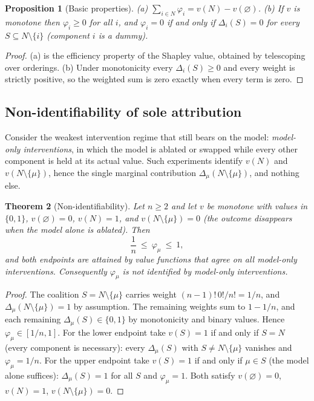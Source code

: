 \documentclass[11pt]{article}
\newtheorem{theorem}{Theorem}[section]
\newtheorem{proposition}[theorem]{Proposition}
\theoremstyle{definition}
\begin{document}
\begin{proposition}[Basic properties]\label{prop:B1}
(a) $\sum_{i\in N}\varphi_i=v(N)-v(\varnothing)$. (b) If $v$ is monotone then $\varphi_i\ge0$ for all $i$, and $\varphi_i=0$ if and only if $\Delta_i(S)=0$ for every $S\subseteq N\setminus\{i\}$ (component $i$ is a \emph{dummy}).
\end{proposition}
\begin{proof}
(a) is the efficiency property of the Shapley value, obtained by telescoping over orderings. (b) Under monotonicity every $\Delta_i(S)\ge0$ and every weight is strictly positive, so the weighted sum is zero exactly when every term is zero.
\end{proof}

\subsection{Non-identifiability of sole attribution}

Consider the weakest intervention regime that still bears on the model: \emph{model-only interventions}, in which the model is ablated or swapped while every other component is held at its actual value. Such experiments identify $v(N)$ and $v(N\setminus\{\mu\})$, hence the single marginal contribution $\Delta_\mu(N\setminus\{\mu\})$, and nothing else.

\begin{theorem}[Non-identifiability]\label{thm:B1}
Let $n\ge2$ and let $v$ be monotone with values in $\{0,1\}$, $v(\varnothing)=0$, $v(N)=1$, and $v(N\setminus\{\mu\})=0$ (the outcome disappears when the model alone is ablated). Then
\[
\frac1n\ \le\ \varphi_\mu\ \le\ 1,
\]
and both endpoints are attained by value functions that agree on all model-only interventions. Consequently $\varphi_\mu$ is not identified by model-only interventions.
\end{theorem}
\begin{proof}
The coalition $S=N\setminus\{\mu\}$ carries weight $(n-1)!\,0!/n!=1/n$, and $\Delta_\mu(N\setminus\{\mu\})=1$ by assumption. The remaining weights sum to $1-1/n$, and each remaining $\Delta_\mu(S)\in\{0,1\}$ by monotonicity and binary values. Hence $\varphi_\mu\in[1/n,1]$. For the lower endpoint take $v(S)=1$ if and only if $S=N$ (every component is necessary): every $\Delta_\mu(S)$ with $S\ne N\setminus\{\mu\}$ vanishes and $\varphi_\mu=1/n$. For the upper endpoint take $v(S)=1$ if and only if $\mu\in S$ (the model alone suffices): $\Delta_\mu(S)=1$ for all $S$ and $\varphi_\mu=1$. Both satisfy $v(\varnothing)=0$, $v(N)=1$, $v(N\setminus\{\mu\})=0$.
\end{proof}
\end{document}
